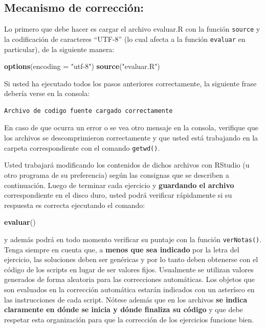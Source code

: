 \documentclass[]{article}
\newenvironment{Shaded}{}{}
\newcommand{\KeywordTok}[1]{\textcolor[rgb]{0.00,0.44,0.13}{\textbf{{#1}}}}
\newcommand{\DataTypeTok}[1]{\textcolor[rgb]{0.56,0.13,0.00}{{#1}}}
\newcommand{\StringTok}[1]{\textcolor[rgb]{0.25,0.44,0.63}{{#1}}}
\newcommand{\NormalTok}[1]{{#1}}
\begin{document}
\subsection{Mecanismo de corrección:}

Lo primero que debe hacer es cargar el archivo evaluar.R con la función
\texttt{source} y la codificación de caracteres ``UTF-8'' (lo cual
afecta a la función \texttt{evaluar} en particular), de la siguiente
manera:

\begin{Shaded}
\begin{Highlighting}[]
\KeywordTok{options}\NormalTok{(}\DataTypeTok{encoding =} \StringTok{"utf-8"}\NormalTok{)}
\KeywordTok{source}\NormalTok{(}\StringTok{"evaluar.R"}\NormalTok{)}
\end{Highlighting}
\end{Shaded}
Si usted ha ejecutado todos los pasos anteriores correctamente, la
siguiente frase debería verse en la consola:

\begin{verbatim}
Archivo de codigo fuente cargado correctamente
\end{verbatim}
En caso de que ocurra un error o se vea otro mensaje en la consola,
verifique que los archivos se descomprimieron correctamente y que usted
está trabajando en la carpeta correspondiente con el comando
\texttt{getwd()}.

Usted trabajará modificando los contenidos de dichos archivos con
RStudio (u otro programa de su preferencia) según las consignas que se
describen a continuación. Luego de terminar cada ejercicio y
\textbf{guardando el archivo} correspondiente en el disco duro, usted
podrá verificar rápidamente si su respuesta es correcta ejecutando el
comando:

\begin{Shaded}
\begin{Highlighting}[]
\KeywordTok{evaluar}\NormalTok{()}
\end{Highlighting}
\end{Shaded}
y además podrá en todo momento verificar su puntaje con la función
\texttt{verNotas()}. Tenga siempre en cuenta que, a \textbf{menos que
sea indicado} por la letra del ejercicio, las soluciones deben ser
genéricas y por lo tanto deben obtenerse con el código de los scripts en
lugar de ser valores fijos. Usualmente se utilizan valores generados de
forma aleatoria para las correcciones automáticas. Los objetos que son
evaluados en la corrección automática estarán indicados con un asterísco
en las instrucciones de cada script. Nótese además que en los archivos
\textbf{se indica claramente en dónde se inicia y dónde finaliza su
código} y que debe respetar esta organización para que la corrección de
los ejercicios funcione bien.
\end{document}
